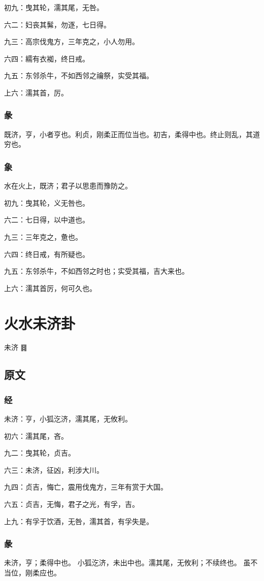 \documentclass[12pt,oneside]{book}
\begin{document}
初九：曳其轮，濡其尾，无咎。

六二：妇丧其髴，勿逐，七日得。

九三：高宗伐鬼方，三年克之，小人勿用。

六四：繻有衣袽，终日戒。

九五：东邻杀牛，不如西邻之禴祭，实受其福。

上六：濡其首，厉。

\subsection{彖}
既济，亨，小者亨也。利贞，刚柔正而位当也。初吉，柔得中也。终止则乱，其道穷也。

\subsection{象}
水在火上，既济；君子以思患而豫防之。

初九：曳其轮，义无咎也。

六二：七日得，以中道也。

九三：三年克之，惫也。

六四：终日戒，有所疑也。

九五：东邻杀牛，不如西邻之时也；实受其福，吉大来也。

上六：濡其首厉，何可久也。

\chapter{火水未济卦}
未济 {\Large ䷿}
\section{原文}

\subsection{经}
未济：亨，小狐汔济，濡其尾，无攸利。

初六：濡其尾，吝。

九二：曳其轮，贞吉。

六三：未济，征凶，利涉大川。

九四：贞吉，悔亡，震用伐鬼方，三年有赏于大国。

六五：贞吉，无悔，君子之光，有孚，吉。

上九：有孚于饮酒，无咎，濡其首，有孚失是。

\subsection{彖}
未济，亨；柔得中也。 小狐汔济，未出中也。濡其尾，无攸利；不续终也。 虽不当位，刚柔应也。
\end{document}
